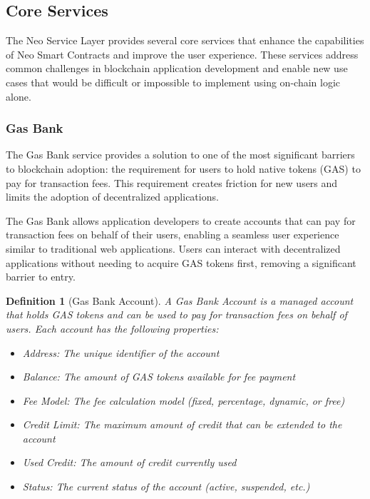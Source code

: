 \documentclass{article}
\newtheorem{definition}{Definition}
\begin{document}
\subsection{Core Services}
\label{subsec:nsl-core-services}

The Neo Service Layer provides several core services that enhance the capabilities of Neo Smart Contracts and improve the user experience. These services address common challenges in blockchain application development and enable new use cases that would be difficult or impossible to implement using on-chain logic alone.

\subsubsection{Gas Bank}
\label{subsubsec:gas-bank}

The Gas Bank service provides a solution to one of the most significant barriers to blockchain adoption: the requirement for users to hold native tokens (GAS) to pay for transaction fees. This requirement creates friction for new users and limits the adoption of decentralized applications.



The Gas Bank allows application developers to create accounts that can pay for transaction fees on behalf of their users, enabling a seamless user experience similar to traditional web applications. Users can interact with decentralized applications without needing to acquire GAS tokens first, removing a significant barrier to entry.

\begin{definition}[Gas Bank Account]
A Gas Bank Account is a managed account that holds GAS tokens and can be used to pay for transaction fees on behalf of users. Each account has the following properties:
\begin{itemize}
    \item Address: The unique identifier of the account
    \item Balance: The amount of GAS tokens available for fee payment
    \item Fee Model: The fee calculation model (fixed, percentage, dynamic, or free)
    \item Credit Limit: The maximum amount of credit that can be extended to the account
    \item Used Credit: The amount of credit currently used
    \item Status: The current status of the account (active, suspended, etc.)
\end{itemize}
\end{definition}
\end{document}
